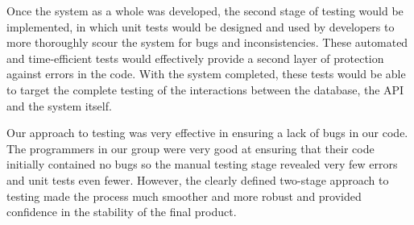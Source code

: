 \documentclass[11pt]{article}
\begin{document}
Once the system as a whole was developed, the second stage of testing would be 
implemented, in which unit tests would be designed and used by developers to 
more thoroughly scour the system for bugs and inconsistencies. These automated 
and time-efficient tests would effectively provide a second layer of protection 
against errors in the code. With the system completed, these tests would be able 
to target the complete testing of the interactions between the database, the API 
and the system itself.\par

Our approach to testing was very effective in ensuring a lack of bugs 
in our code. The programmers in our group were very good at ensuring that 
their code initially contained no bugs so the manual testing stage 
revealed very few errors and unit tests even fewer. However, the clearly 
defined two-stage approach to testing made the process much smoother and 
more robust and provided confidence in the stability of the final product.\par 
\end{document}
